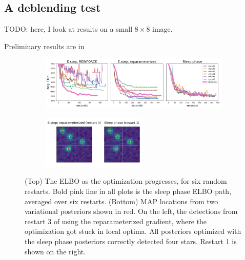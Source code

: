 \subsection{A deblending test}
\label{sec:deblending_test}

TODO: here, I look at results on a small $8 \times 8$ image. 

Preliminary results are in 


\begin{figure}[!htb]
    \centering
    \begin{subfigure}[t]{0.9\textwidth}
    \centering
    \includegraphics[width=\textwidth]{figures/optim_path_compare.png}
    \end{subfigure}
    \begin{subfigure}[t]{\textwidth}
    \centering
    \includegraphics[width=0.55\textwidth]{figures/optim_path_detect_compare.png}
    \end{subfigure}
    \vspace{-3em}
    \caption{(Top) The ELBO as the optimization progresses, for six random restarts. Bold pink line in all plots is the sleep phase ELBO path, averaged over six restarts. (Bottom) MAP locations from two variational posteriors shown in red. On the left, the detections from restart 3 of using the reparameterized gradient, where the optimization got stuck in local optima. All posteriors optimized with the sleep phase posteriors correctly detected four stars. Restart 1 is shown on the right. }
    \label{fig:optim_path}
\end{figure}
